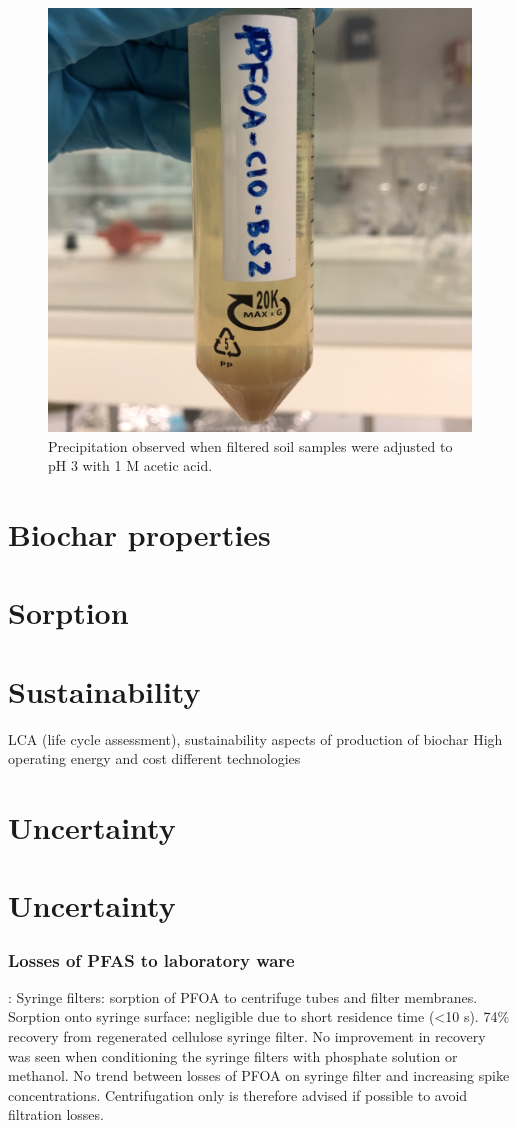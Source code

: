 \begin{figure}
    \centering
    \includegraphics[width=0.6\linewidth,scale=0.6]{Bilder/Samples/Precipitation.jpg}
    \caption{Precipitation observed when filtered soil samples were adjusted to pH 3 with 1 M acetic acid.}
    \label{fig:precip}
\end{figure}

\section{Biochar properties}





\section{Sorption}





\section{Sustainability}
LCA (life cycle assessment), sustainability aspects of production of biochar
High operating energy and cost different technologies \citep{Alhashimi2017}


\section{Uncertainty}
\section{Uncertainty}
\subsubsection{Losses of PFAS to laboratory ware}
\citep{Lath2019labsorb}: 
Syringe filters: sorption of PFOA to centrifuge tubes and filter membranes. Sorption onto syringe surface: negligible due to short residence time (\textless 10 s). 74\% recovery from regenerated cellulose syringe filter. No improvement in recovery was seen when conditioning the syringe filters with phosphate solution or methanol. No trend between losses of PFOA on syringe filter and increasing spike concentrations. Centrifugation only is therefore advised if possible to avoid filtration losses. 


